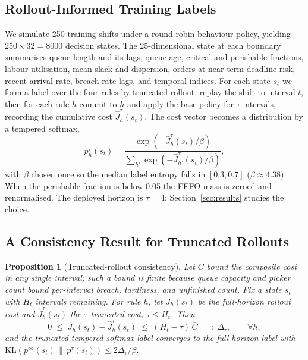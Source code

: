 \documentclass[conference]{IEEEtran}
\newtheorem{proposition}{Proposition}
\begin{document}
\subsection{Rollout-Informed Training Labels}
\label{sec:labels}

We simulate 250 training shifts under a round-robin behaviour policy, yielding
$250 \times 32 = 8000$ decision states. The 25-dimensional state at each boundary
summarises queue length and its lags, queue age, critical and perishable
fractions, labour utilisation, mean slack and dispersion, orders at near-term
deadline risk, recent arrival rate, breach-rate lags, and temporal indices. For
each state $s_t$ we form a label over the four rules by truncated rollout: replay
the shift to interval $t$, then for each rule $h$ commit to $h$ and apply the base
policy for $\tau$ intervals, recording the cumulative cost
$\hat{J}^{\tau}_h(s_t)$. The cost vector becomes a distribution by a tempered
softmax,
\begin{equation}
p^{\tau}_h(s_t) = \frac{\exp(-\hat{J}^{\tau}_h(s_t)/\beta)}
                       {\sum_{h'} \exp(-\hat{J}^{\tau}_{h'}(s_t)/\beta)},
\label{eq:softmax}
\end{equation}
with $\beta$ chosen once so the median label entropy falls in $[0.3,0.7]$
($\beta \approx 4.38$). When the perishable fraction is below 0.05 the FEFO mass is
zeroed and renormalised. The deployed horizon is $\tau = 4$;
Section~\ref{sec:results} studies the choice.

\subsection{A Consistency Result for Truncated Rollouts}
\label{sec:consistency}

\begin{proposition}[Truncated-rollout consistency]
\label{prop:consistency}
Let $\bar{C}$ bound the composite cost in any single interval; such a bound is
finite because queue capacity and picker count bound per-interval breach,
tardiness, and unfinished count. Fix a state $s_t$ with $H_t$ intervals remaining.
For rule $h$, let $J_h(s_t)$ be the full-horizon rollout cost and
$\hat{J}^{\tau}_h(s_t)$ the $\tau$-truncated cost, $\tau \le H_t$. Then
\[
0 \;\le\; J_h(s_t) - \hat{J}^{\tau}_h(s_t) \;\le\; (H_t - \tau)\,\bar{C}
  \;=:\; \Delta_\tau, \qquad \forall h,
\]
and the truncated tempered-softmax label converges to the full-horizon label with
$\mathrm{KL}(p^{\infty}(s_t)\,\|\,p^{\tau}(s_t)) \le 2\Delta_\tau/\beta$.
\end{proposition}
\end{document}
